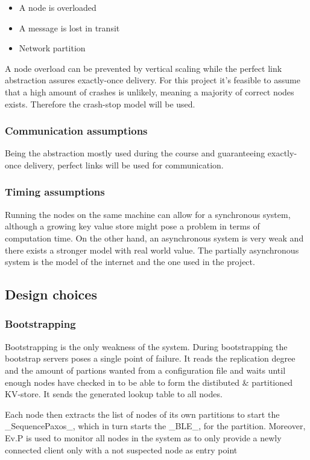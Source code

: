 \documentclass[a4paper]{scrartcl}
\begin{document}
\begin{itemize}
\item A node is overloaded
\item A message is lost in transit
\item Network partition
\end{itemize}

A node overload can be prevented by vertical scaling while the perfect link abstraction assures exactly-once delivery.
For this project it’s feasible to assume that a high amount of crashes is unlikely, meaning a majority of correct nodes exists. Therefore the crash-stop model will be used.


\subsubsection{Communication assumptions}
Being the abstraction mostly used during the course and guaranteeing exactly-once delivery, perfect links will be used for communication.

\subsubsection{Timing assumptions}
Running the nodes on the same machine can allow for a synchronous system, although a growing key value store might pose a problem in terms of computation time.
On the other hand, an asynchronous system is very weak and there exists a stronger model with real world value.
The partially asynchronous system is the model of the internet and the one used in the project.



\subsection{Design choices}


\subsubsection{Bootstrapping}
Bootstrapping is the only weakness of the system.
During bootstrapping the bootstrap servers poses a single point of failure.
It reads the replication degree and the amount of partions wanted from a configuration file and waits until enough nodes have checked in to be able to form the distibuted \& partitioned KV-store.
It sends the generated lookup table to all nodes.

Each node then extracts the list of nodes of its own partitions to start the _SequencePaxos_, which in turn starts the _BLE_, for the partition.
Moreover, Ev.P is used to monitor all nodes in the system as to only provide a newly connected client only with a not suspected node as entry point
\end{document}
